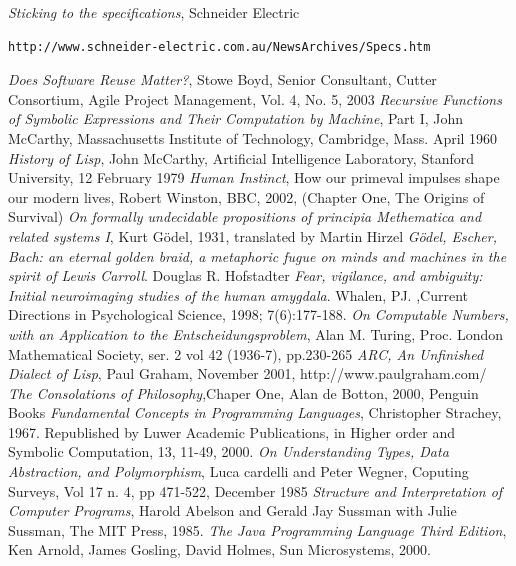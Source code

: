 \documentclass[a4paper,12pt,dvips]{article}
\begin{document}
\begin{thebibliography}{99}
\emph{Sticking to the specifications}, Schneider Electric \begin{verbatim}http://www.schneider-electric.com.au/NewsArchives/Specs.htm\end{verbatim}
 \textit{Does Software Reuse Matter?}, Stowe Boyd,
Senior Consultant, Cutter Consortium, Agile Project
Management, Vol. 4, No. 5, 2003
 \textit{Recursive Functions of Symbolic Expressions and Their Computation by Machine}, Part I, John McCarthy, Massachusetts Institute of Technology, Cambridge, Mass. April 1960
 \textit{History of Lisp}, John McCarthy, Artificial Intelligence Laboratory, Stanford University, 12 February 1979
 \textit{Human Instinct}, How our primeval impulses shape our modern lives, Robert Winston, BBC, 2002, (Chapter One, The Origins of Survival)
\textit{On formally undecidable propositions of principia Methematica and related systems I}, Kurt G\"odel, 1931, translated by Martin Hirzel
 \textit{G\"odel, Escher, Bach: an eternal golden braid, a metaphoric fugue on minds and machines in the spirit of Lewis Carroll}. Douglas R. Hofstadter
\textit{Fear, vigilance, and ambiguity: Initial neuroimaging studies of the human amygdala}.  Whalen, PJ. ,Current Directions in Psychological Science, 1998; 7(6):177-188.
 \textit{On Computable Numbers, with an Application to the Entscheidungsproblem}, Alan M. Turing, Proc. London Mathematical Society, ser. 2 vol 42 (1936-7), pp.230-265
 \textit{ARC, An Unfinished Dialect of Lisp}, Paul Graham, November 2001, http://www.paulgraham.com/
 \textit{The Consolations of Philosophy},Chaper One, Alan de Botton, 2000, Penguin Books
 \textit{Fundamental Concepts in Programming Languages}, Christopher Strachey, 1967. Republished by Luwer Academic Publications, in Higher order and Symbolic Computation, 13, 11-49, 2000.
 \textit{On Understanding Types, Data Abstraction, and Polymorphism}, Luca cardelli and Peter Wegner, Coputing Surveys, Vol 17 n. 4, pp 471-522, December 1985
 \textit{Structure and Interpretation of Computer Programs}, Harold Abelson and Gerald Jay Sussman with Julie Sussman, The MIT Press, 1985.
 \textit{The Java Programming Language Third Edition}, Ken Arnold, James Gosling, David Holmes, Sun Microsystems, 2000.
\end{thebibliography}
\end{document}
